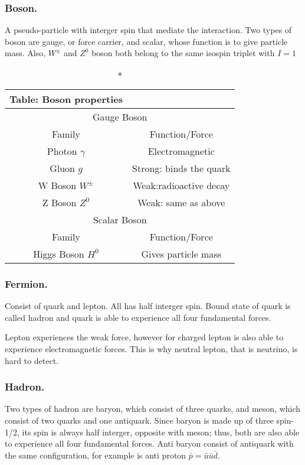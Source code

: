 \documentclass[../../../main.tex]{subfiles}
\begin{document}
\subsubsection*{Boson.} A pseudo-particle with interger spin that mediate the interaction. Two types of boson are gauge, or force carrier, and scalar, whose function is to give particle mass. Also, $W^{\pm}$ and $Z^0$ boson both belong to the same isospin triplet with $I=1$
\begin{longtable}{cc}
    \caption*{Table: Boson properties}\\
    \toprule
    \multicolumn{2}{c}{Gauge Boson}\\
    \midrule
    Family&Function/Force\\
    \midrule
    Photon $\gamma$&Electromagnetic\\
    Gluon $g$&Strong: binds the quark\\
    W Boson $W^{\pm}$&Weak:radioactive decay\\
    Z Boson $Z^0$&Weak: same as above\\
    \bottomrule
    \toprule
    \multicolumn{2}{c}{Scalar Boson}\\
    \midrule
    Family&Function/Force\\
    \midrule
    Higgs Boson $H^0$&Gives particle mass\\
    \bottomrule
\end{longtable}

\subsubsection*{Fermion.} Consist of quark and lepton. All has half interger spin. Bound state of quark is called hadron and quark is able to experience all four fundamental forces.

Lepton experiences the weak force, however for charged lepton is also able to experience electromagnetic forces. This is why neutral lepton, that is neutrino, is hard to detect.

\subsubsection*{Hadron.} Two types of hadron are baryon, which consist of three quarks, and meson, which consist of two quarks and one antiquark. Since baryon is made up of three spin-1/2, its spin is always half interger, opposite with meson; thus, both are also able to experience all four fundamental forces. Anti baryon consist of antiquark with the same configuration, for example is anti proton $\bar{p}=\bar{u}\bar{u}\bar{d}$.
\end{document}
